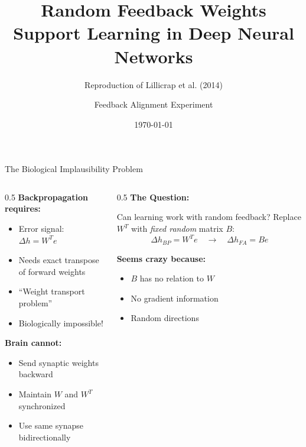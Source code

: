 \documentclass[aspectratio=169,10pt]{beamer}
\title{Random Feedback Weights Support Learning in Deep Neural Networks}
\subtitle{Reproduction of Lillicrap et al. (2014)}
\author{Feedback Alignment Experiment}
\date{\today}
\begin{document}
\begin{frame}
  \titlepage
\end{frame}

\begin{frame}{The Biological Implausibility Problem}
  \begin{columns}[T]
    \begin{column}{0.5\textwidth}
      \textbf{Backpropagation requires:}
      \begin{itemize}
        \item Error signal: $\Delta h = W^T e$
        \item Needs exact transpose of forward weights
        \item ``Weight transport problem''
        \item \alert{Biologically impossible!}
      \end{itemize}

      \vspace{0.5cm}
      \textbf{Brain cannot:}
      \begin{itemize}
        \item Send synaptic weights backward
        \item Maintain $W$ and $W^T$ synchronized
        \item Use same synapse bidirectionally
      \end{itemize}
    \end{column}

    \begin{column}{0.5\textwidth}
      \textbf{The Question:}
      \begin{block}{Can learning work with random feedback?}
        Replace $W^T$ with \textit{fixed random} matrix $B$:
        \[
        \Delta h_{BP} = W^T e \quad \rightarrow \quad \Delta h_{FA} = B e
        \]
      \end{block}

      \vspace{0.3cm}
      \textbf{Seems crazy because:}
      \begin{itemize}
        \item $B$ has no relation to $W$
        \item No gradient information
        \item Random directions
      \end{itemize}
    \end{column}
  \end{columns}
\end{frame}
\end{document}

